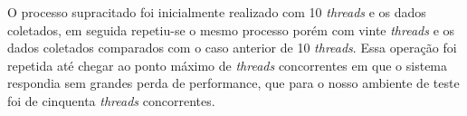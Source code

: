	O processo supracitado foi inicialmente realizado com 10 \textit{threads} e os dados coletados, em seguida repetiu-se o mesmo processo porém com vinte \textit{threads} e os dados coletados comparados com o caso anterior de 10 \textit{threads}. Essa operação foi repetida até chegar ao ponto máximo de \textit{threads} concorrentes em que o sistema respondia sem grandes perda de performance, que para o nosso ambiente de teste foi de cinquenta \textit{threads} concorrentes.
	\\
